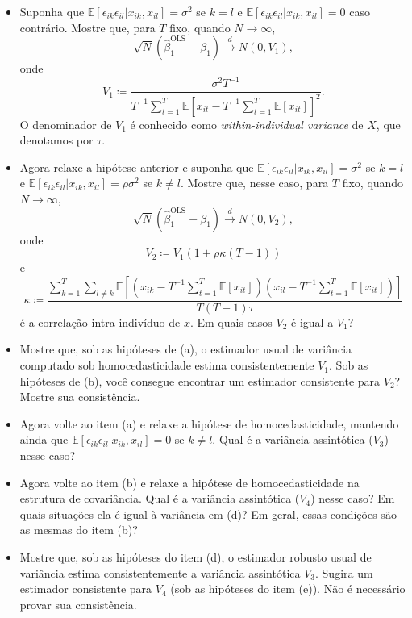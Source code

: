 \documentclass[10pt,a4paper]{article}
\begin{document}
 \begin{itemize}
 	\item[a] Suponha que $\mathbb{E}[\epsilon_{ik}\epsilon_{il}|x_{ik},x_{il}] = \sigma^2$ se $k = l$ e $\mathbb{E}[\epsilon_{ik}\epsilon_{il}|x_{ik},x_{il}] = 0 $ caso contrário. Mostre que, para $T$ fixo, quando $N \to \infty$, 
 	\[
 	\sqrt{N}(\hat{\beta}_1^\text{OLS} - \beta_1) \overset{d}{\to} N\left(0, V_1  \right),
 	\]
 	onde 
 	\[
 	V_1 \coloneqq \frac{\sigma^2 T^{-1}}{T^{-1}\sum_{t=1}^T\mathbb{E}[x_{it} - T^{-1}\sum_{t=1}^T \mathbb{E}[x_{it}]]^2}.
 	\]
 	O denominador de $V_1$ é conhecido como \emph{within-individual variance} de $X$, que denotamos por $\tau$.
 	
 	\item[b] Agora relaxe a hipótese anterior e suponha que $\mathbb{E}[\epsilon_{ik}\epsilon_{il}|x_{ik},x_{il}] = \sigma^2$ se $k = l$ e $\mathbb{E}[\epsilon_{ik}\epsilon_{il}|x_{ik},x_{il}] = \rho \sigma^2 $ se $k \neq l$. Mostre que, nesse caso, para $T$ fixo, quando $N \to \infty$,
 	\[
 	\sqrt{N}(\hat{\beta}_1^\text{OLS} - \beta_1) \overset{d}{\to} N(0, V_2),
 	\]
 	onde
 	\[
 	V_2 \coloneqq V_1 \left(1 + \rho \kappa (T-1)  \right)
 	\]
 	e 
 	\[
 	\kappa \coloneqq 
 	\frac{\sum_{k=1}^T \sum_{l\neq k }\mathbb{E}\left[\left(x_{ik} - T^{-1}\sum_{t=1}^T \mathbb{E}[x_{it}]\right)\left(x_{il} - T^{-1}\sum_{t=1}^T \mathbb{E}[x_{it}]\right)\right]}{T(T-1) \tau }
 	\]
 	é a correlação intra-indivíduo de $x$. Em quais casos $V_2$ é igual a $V_1$?
 	
 	\item[c] Mostre que, sob as hipóteses de (a), o estimador usual de variância computado sob homocedasticidade estima consistentemente $V_1$. Sob as hipóteses de (b), você consegue encontrar um estimador consistente para $V_2$? Mostre sua consistência.
 	
 	\item[d] Agora volte ao item (a) e relaxe a hipótese de homocedasticidade, mantendo ainda que $\mathbb{E}[\epsilon_{ik}\epsilon_{il}|x_{ik},x_{il}] = 0 $ se $k \neq l$. Qual é a variância assintótica ($V_3$) nesse caso?
 	
 	\item[e] Agora volte ao item (b) e relaxe a hipótese de homocedasticidade na estrutura de covariância. Qual é a variância assintótica ($V_4$) nesse caso? Em quais situações ela é igual à variância em (d)? Em geral, essas condições são as mesmas do item (b)?
 	
 	\item[f] Mostre que, sob as hipóteses do item (d), o estimador robusto usual de variância estima consistentemente a variância assintótica $V_3$. Sugira um estimador consistente para $V_4$ (sob as hipóteses do item (e)). Não é necessário provar sua consistência.
 \end{itemize}
 
\end{document}
